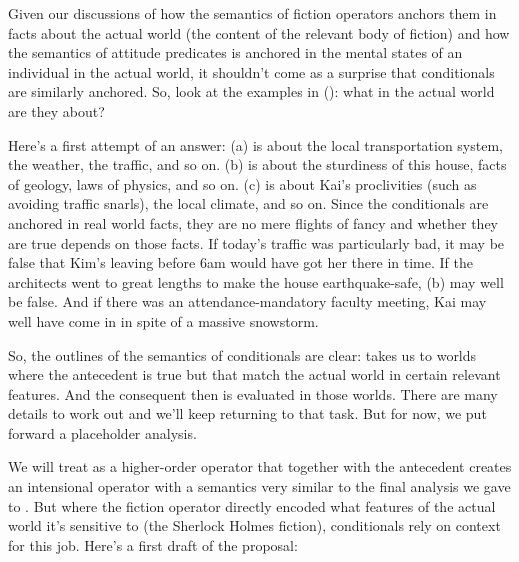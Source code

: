 %
%
%
Given our discussions of how the semantics of fiction operators anchors them in
facts about the actual world (the content of the relevant body of fiction) and
how the semantics of attitude predicates is anchored in the mental states of an
individual in the actual world, it shouldn't come as a surprise that
conditionals are similarly anchored. So, look at the examples in (\lastx): what
in the actual world are they about?

Here's a first attempt of an answer: (\lastx a) is about the local
transportation system, the weather, the traffic, and so on. (\lastx b) is about
the sturdiness of this house, facts of geology, laws of physics, and so on.
(\lastx c) is about Kai's proclivities (such as avoiding traffic snarls), the
local climate, and so on. Since the conditionals are anchored in real world
facts, they are no mere flights of fancy and whether they are true depends on
those facts. If today's traffic was particularly bad, it may be false that Kim's
leaving before 6am would have got her there in time. If the architects went to
great lengths to make the house earthquake-safe, (\lastx b) may well be false.
And if there was an attendance-mandatory faculty meeting, Kai may well have come
in in spite of a massive snowstorm.

So, the outlines of the semantics of conditionals are clear: 
takes us to worlds where the antecedent is true but that match the actual world
in certain relevant features. And the consequent then is evaluated in those
worlds. There are many details to work out and we'll keep returning to that
task. But for now, we put forward a placeholder analysis.

We will treat  as a higher-order operator that together with the
antecedent creates an intensional operator with a semantics very similar to the
final analysis we gave to . But
where the fiction operator directly encoded what features of the actual world
it's sensitive to (the Sherlock Holmes fiction), conditionals rely on context
for this job. Here's a first draft of the proposal:

